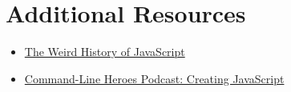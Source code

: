 \section{Additional Resources}

\begin{itemize}[leftmargin=*]
    \item \href{https://javascriptweekly.com/link/66136/f8cbfdb908}{The Weird History of JavaScript}
    \item \href{https://www.redhat.com/en/command-line-heroes/season-3/creating-javascript}{Command-Line Heroes Podcast: Creating JavaScript}
\end{itemize}
